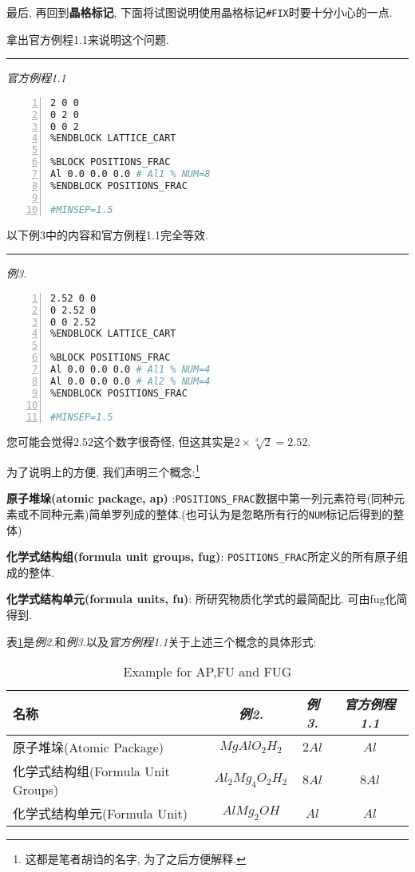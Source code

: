 \documentclass[a4paper, 10pt]{article}
\begin{document}
        最后, 再回到\textbf{晶格标记}, 下面将试图说明使用晶格标记\verb|#FIX|时要十分小心的一点. 

        拿出官方例程1.1来说明这个问题.
        
        \noindent\rule{\textwidth}{0.3mm}

        \emph{官方例程1.1}
        \begin{lstlisting}[language={bash},numbers=left]
%BLOCK LATTICE_CART
2 0 0
0 2 0
0 0 2 
%ENDBLOCK LATTICE_CART
  
%BLOCK POSITIONS_FRAC
Al 0.0 0.0 0.0 # Al1 % NUM=8
%ENDBLOCK POSITIONS_FRAC

#MINSEP=1.5
        \end{lstlisting}

        以下例3中的内容和官方例程1.1完全等效.

        \noindent\rule{\textwidth}{0.3mm}

        \emph{例3.}
        \begin{lstlisting}[language={bash},numbers=left]
%BLOCK LATTICE_CART
2.52 0 0
0 2.52 0
0 0 2.52
%ENDBLOCK LATTICE_CART
 
%BLOCK POSITIONS_FRAC
Al 0.0 0.0 0.0 # Al1 % NUM=4
Al 0.0 0.0 0.0 # Al2 % NUM=4
%ENDBLOCK POSITIONS_FRAC

#MINSEP=1.5
         \end{lstlisting}

         您可能会觉得\(2.52\)这个数字很奇怪, 但这其实是\(2\times\sqrt[3]{2} = 2.52\). 

         为了说明上的方便, 我们声明三个概念:\footnote{这都是笔者胡诌的名字, 为了之后方便解释.} 

          \textbf{原子堆垛(atomic package, ap)} :\verb|POSITIONS_FRAC|数据中第一列元素符号(同种元素或不同种元素)简单罗列成的整体.(也可认为是忽略所有行的\verb|NUM|标记后得到的整体)

          \textbf{化学式结构组(formula unit groups, fug)}: \verb|POSITIONS_FRAC|所定义的所有原子组成的整体.

          \textbf{化学式结构单元(formula units, fu)}: 所研究物质化学式的最简配比. 可由fug化简得到.
               
         表\ref{AP_FU_fug}是\emph{例2.}和\emph{例3.}以及\emph{官方例程1.1}关于上述三个概念的具体形式: 

         \begin{table}[H]
          \centering
          \caption{Example for AP,FU and FUG}
          \label{AP_FU_fug}  
          \begin{tabular}{l|c|c|c}
            \toprule
              名称& \emph{例2.}&\emph{例3.}&\emph{官方例程1.1}\\
            \midrule
            原子堆垛(Atomic Package) & \(MgAlO_2H_2\) & \(2Al\)& \(Al\)\\
            \midrule
            化学式结构组(Formula Unit Groups) & \(Al_2Mg_4O_2H_2\) & \(8Al\)& \(8Al\)\\
            \midrule
            化学式结构单元(Formula Unit) & \(AlMg_2OH\) & \(Al\)& \(Al\)\\
            \bottomrule
          \end{tabular} 
        \end{table}
\end{document}
